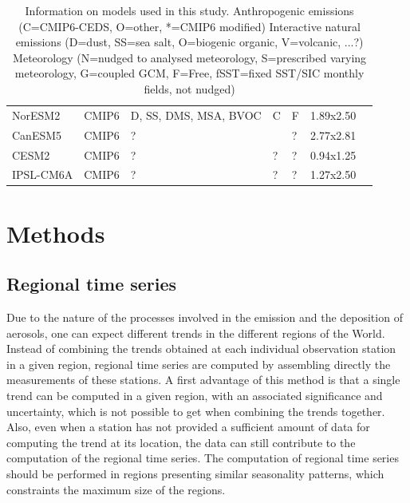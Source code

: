 \documentclass[journal abbreviation, manuscript]{copernicus}
\begin{document}
\begin{table}[]
\begin{tabularx}{\textwidth}{llllllX}
  NorESM2    & CMIP6     & D, SS, DMS, MSA, BVOC      & C                          & F           & 1.89x2.50                  & \cite{olivieprep, selandprep, kirkevag2018production}               \\
  CanESM5    & CMIP6     & ?                          &                            & ?           & 2.77x2.81                  & \cite{gmd-12-4823-2019}                                             \\
  CESM2      & CMIP6     & ?                          & ?                          & ?           & 0.94x1.25                  &                                                                     \\
  IPSL-CM6A  & CMIP6     & ?                          & ?                          & ?           & 1.27x2.50                  &                                                                     \\ \bottomrule
 \end{tabularx}
 \caption{Information on models used in this study.
  Anthropogenic emissions (C=CMIP6-CEDS, O=other, *=CMIP6 modified)
  Interactive natural emissions (D=dust, SS=sea salt, O=biogenic organic, V=volcanic, ...?)
  Meteorology (N=nudged to analysed meteorology, S=prescribed varying meteorology, G=coupled GCM, F=Free, fSST=fixed SST/SIC monthly fields, not nudged)
 }
 \label{table:models}
\end{table}

\section{Methods}

\subsection{Regional time series}
Due to the nature of the processes involved in the emission and the deposition of aerosols, one can expect different trends in the different regions of the World. Instead of combining the trends obtained at each individual observation station in a given region, regional time series are computed by assembling directly the measurements of these stations. A first advantage of this method is that a single trend can be computed in a given region, with an associated significance and uncertainty, which is not possible to get when combining the trends together. Also, even when a station has not provided a sufficient amount of data for computing the trend at its location, the data can still contribute to the computation of the regional time series. The computation of regional time series should be performed in regions presenting similar seasonality patterns, which constraints the maximum size of the regions.
\end{document}
